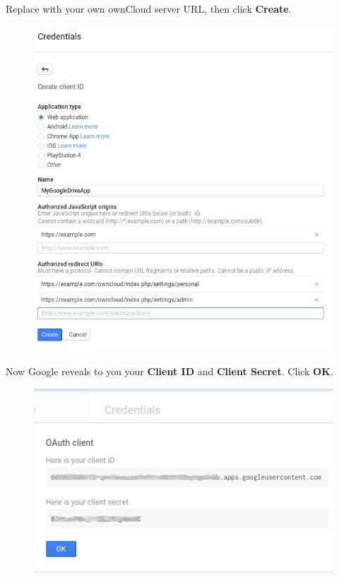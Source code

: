 \documentclass[letterpaper,10pt,english]{sphinxmanual}
\begin{document}
Replace  with your own ownCloud server URL,
then click \textbf{Create}.
\begin{figure}[htbp]
\centering

\includegraphics{google-drive9.png}
\end{figure}

Now Google reveals to you your \textbf{Client ID} and \textbf{Client Secret}. Click
\textbf{OK}.
\begin{figure}[htbp]
\centering

\includegraphics{google-drive10.png}
\end{figure}
\end{document}
